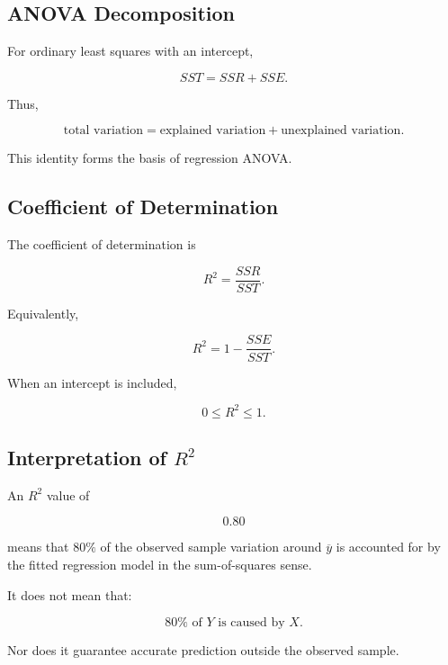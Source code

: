 \subsection{ANOVA Decomposition}
\label{subsec:regression-anova-decomposition}

For ordinary least squares with an intercept,

\[
\boxed{
SST
=
SSR
+
SSE.
}
\]

Thus,

\[
\boxed{
\text{total variation}
=
\text{explained variation}
+
\text{unexplained variation}.
}
\]

This identity forms the basis of regression ANOVA.

\subsection{Coefficient of Determination}
\label{subsec:coefficient-determination}

The coefficient of determination is

\[
\boxed{
R^2
=
\frac{SSR}{SST}.
}
\]

Equivalently,

\[
\boxed{
R^2
=
1-\frac{SSE}{SST}.
}
\]

When an intercept is included,

\[
\boxed{
0\leq R^2\leq1.
}
\]

\subsection{Interpretation of \(R^2\)}
\label{subsec:r2-interpretation}

An \(R^2\) value of

\[
0.80
\]

means that \(80\%\) of the observed sample variation around
\(\overline{y}\) is accounted for by the fitted regression model in the
sum-of-squares sense.

It does not mean that:

\[
\boxed{
80\%
\text{ of }Y
\text{ is caused by }X.
}
\]

Nor does it guarantee accurate prediction outside the observed sample.

